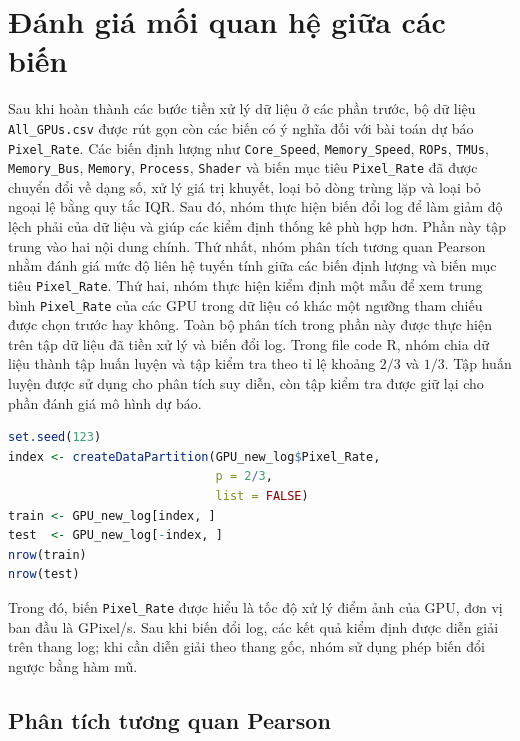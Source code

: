 \section{Đánh giá mối quan hệ giữa các biến}
Sau khi hoàn thành các bước tiền xử lý dữ liệu ở các phần trước, bộ dữ liệu \texttt{All\_GPUs.csv} được rút gọn còn các biến có ý nghĩa đối với bài toán dự báo \texttt{Pixel\_Rate}. Các biến định lượng như \texttt{Core\_Speed}, \texttt{Memory\_Speed}, \texttt{ROPs}, \texttt{TMUs}, \texttt{Memory\_Bus}, \texttt{Memory}, \texttt{Process}, \texttt{Shader} và biến mục tiêu \texttt{Pixel\_Rate} đã được chuyển đổi về dạng số, xử lý giá trị khuyết, loại bỏ dòng trùng lặp và loại bỏ ngoại lệ bằng quy tắc IQR. Sau đó, nhóm thực hiện biến đổi log để làm giảm độ lệch phải của dữ liệu và giúp các kiểm định thống kê phù hợp hơn.
Phần này tập trung vào hai nội dung chính. Thứ nhất, nhóm phân tích tương quan Pearson nhằm đánh giá mức độ liên hệ tuyến tính giữa các biến định lượng và biến mục tiêu \texttt{Pixel\_Rate}. Thứ hai, nhóm thực hiện kiểm định một mẫu để xem trung bình \texttt{Pixel\_Rate} của các GPU trong dữ liệu có khác một ngưỡng tham chiếu được chọn trước hay không.
Toàn bộ phân tích trong phần này được thực hiện trên tập dữ liệu đã tiền xử lý và biến đổi log. Trong file code R, nhóm chia dữ liệu thành tập huấn luyện và tập kiểm tra theo tỉ lệ khoảng $2/3$ và $1/3$. Tập huấn luyện được sử dụng cho phân tích suy diễn, còn tập kiểm tra được giữ lại cho phần đánh giá mô hình dự báo.

\begin{lstlisting}[language=R, caption={Chia dữ liệu thành tập huấn luyện và tập kiểm tra}]
set.seed(123)
index <- createDataPartition(GPU_new_log$Pixel_Rate,
                             p = 2/3,
                             list = FALSE)
train <- GPU_new_log[index, ]
test  <- GPU_new_log[-index, ]
nrow(train)
nrow(test)
\end{lstlisting}

Trong đó, biến \texttt{Pixel\_Rate} được hiểu là tốc độ xử lý điểm ảnh của GPU, đơn vị ban đầu là GPixel/s. Sau khi biến đổi log, các kết quả kiểm định được diễn giải trên thang log; khi cần diễn giải theo thang gốc, nhóm sử dụng phép biến đổi ngược bằng hàm mũ.
\subsection{Phân tích tương quan Pearson}

